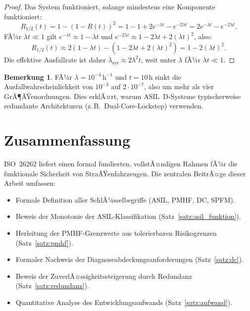 ﻿\documentclass[a4paper,12pt]{article}
\theoremstyle{definition}
\newtheorem{bemerkung}{Bemerkung}
\begin{document}
\begin{proof}
  Das System funktioniert, solange mindestens eine Komponente
  funktioniert:
  \[
    R_{1/2}(t)
    = 1 - (1-R(t))^2
    = 1 - 1 + 2e^{-\lambda t} - e^{-2\lambda t}
    = 2e^{-\lambda t} - e^{-2\lambda t}.
  \]
  FÃ¼r $\lambda t \ll 1$ gilt
  $e^{-\lambda t} \approx 1 - \lambda t$ und
  $e^{-2\lambda t} \approx 1 - 2\lambda t + 2(\lambda t)^2$, also:
  \[
    R_{1/2}(t)
    \approx 2(1-\lambda t) - (1-2\lambda t + 2(\lambda t)^2)
    = 1 - 2(\lambda t)^2.
  \]
  Die effektive Ausfallrate ist daher
  $\lambda_{\mathrm{sys}} \approx 2\lambda^2 t$,
  weit unter $\lambda$ fÃ¼r $\lambda t \ll 1$.
\end{proof}

\begin{bemerkung}
  FÃ¼r $\lambda = 10^{-4}\,\mathrm{h}^{-1}$ und $t = 10\,\mathrm{h}$
  sinkt die Ausfallwahrscheinlichkeit von $10^{-3}$ auf
  $2 \cdot 10^{-7}$, also um mehr als vier GrÃ¶ÃŸenordnungen.
  Dies erklÃ¤rt, warum ASIL~D-Systeme typischerweise redundante
  Architekturen (z.\,B.\ Dual-Core-Lockstep) verwenden.
\end{bemerkung}

\section{Zusammenfassung}

ISO~26262 liefert einen formal fundierten, vollstÃ¤ndigen Rahmen fÃ¼r
die funktionale Sicherheit von StraÃŸenfahrzeugen. Die zentralen
BeitrÃ¤ge dieser Arbeit umfassen:

\begin{itemize}
  \item Formale Definition aller SchlÃ¼sselbegriffe
        (ASIL, PMHF, DC, SPFM).
  \item Beweis der Monotonie der ASIL-Klassifikation
        (Satz~\ref{satz:asil_funktion}).
  \item Herleitung der PMHF-Grenzwerte aus tolerierbaren
        Risikogrenzen (Satz~\ref{satz:pmhf}).
  \item Formaler Nachweis der Diagnoseabdeckungsanforderungen
        (Satz~\ref{satz:dc}).
  \item Beweis der ZuverlÃ¤ssigkeitssteigerung durch Redundanz
        (Satz~\ref{satz:redundanz}).
  \item Quantitative Analyse des Entwicklungsaufwands
        (Satz~\ref{satz:aufwand}).
\end{itemize}
\end{document}
